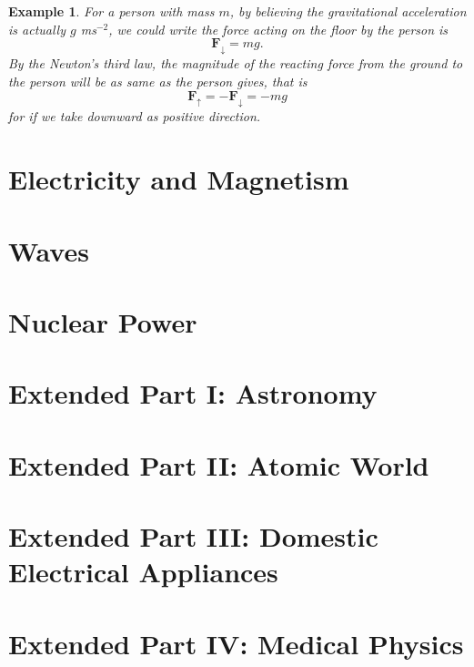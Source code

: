 \documentclass[12pt]{article}
\newtheorem*{example}{Example}
\begin{document}
    \begin{example}
        For a person with mass $m$, by believing the gravitational acceleration is actually $g$ ms$^{-2}$, we could write the force acting on the floor by the person is \[\mathbf{F}_{\downarrow}=mg.\] By the Newton's third law, the magnitude of the reacting force from the ground to the person will be as same as the person gives, that is \[\mathbf{F}_{\uparrow}=-\mathbf{F}_{\downarrow}=-mg\] for if we take downward as positive direction.
    \end{example}

    \newpage
    \section{Electricity and Magnetism}

    \newpage
    \section{Waves}

    \newpage
    \section{Nuclear Power}

    \newpage
    \section{Extended Part I: Astronomy}

    \newpage
    \section{Extended Part II: Atomic World}

    \newpage
    \section{Extended Part III: Domestic Electrical Appliances}

    \newpage
    \section{Extended Part IV: Medical Physics}
\end{document}
